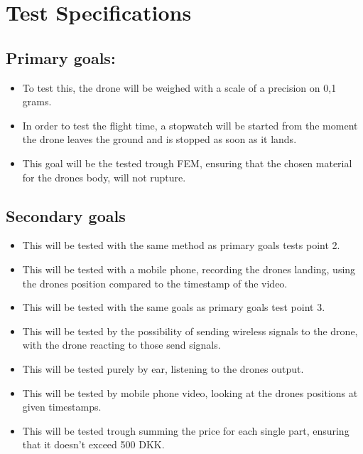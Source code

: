 \documentclass{article}
\begin{document}
\section {Test Specifications} 
\subsection{Primary goals:}
\begin{itemize}
    \item
    To test this, the drone will be weighed with a scale of a precision on 0,1 grams.
    \item  
    In order to test the flight time, a stopwatch will be started from the moment the drone leaves the ground and is stopped as soon as it lands.
    \item
    This goal will be the tested trough FEM, ensuring that the chosen material for the drones body, will not rupture.
\end{itemize}
  
\subsection{Secondary goals}
\begin{itemize}
    \item
    This will be tested with the same method as primary goals tests point 2. 
    \item
    This will be tested with a mobile phone, recording the drones landing, using the drones position compared to the timestamp of the video.  
    \item
    This will be tested with the same goals as primary goals test point 3.  
    \item
    This will be tested by the possibility of sending wireless signals to the drone, with the drone reacting to those send signals.  
    \item
    This will be tested purely by ear, listening to the drones output.  
    \item
    This will be tested by mobile phone video, looking at the drones positions at given timestamps.  
    \item
    This will be tested trough summing the price for each single part, ensuring that it doesn’t exceed 500 DKK. 
\end{itemize}
\end{document}
